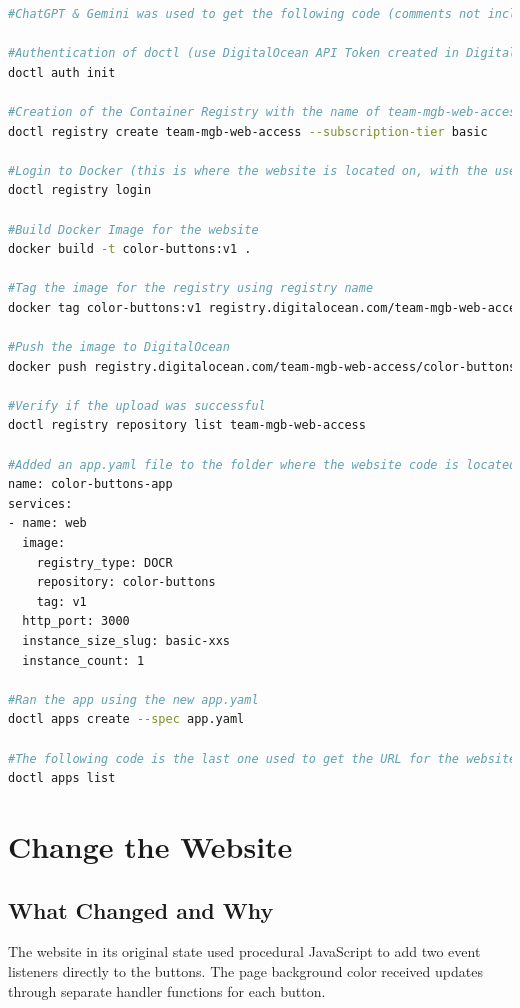 \begin{lstlisting}[style=linuxstyle, language=bash]
#ChatGPT & Gemini was used to get the following code (comments not included):

#Authentication of doctl (use DigitalOcean API Token created in DigitalOcean)
doctl auth init

#Creation of the Container Registry with the name of team-mgb-web-access and a basic tier subscription
doctl registry create team-mgb-web-access --subscription-tier basic

#Login to Docker (this is where the website is located on, with the use of DigitalOcean for cloud service)
doctl registry login

#Build Docker Image for the website
docker build -t color-buttons:v1 .

#Tag the image for the registry using registry name
docker tag color-buttons:v1 registry.digitalocean.com/team-mgb-web-access/color-buttons:v1

#Push the image to DigitalOcean
docker push registry.digitalocean.com/team-mgb-web-access/color-buttons:v1

#Verify if the upload was successful
doctl registry repository list team-mgb-web-access

#Added an app.yaml file to the folder where the website code is located, same place as the docker file, to tell DigitalOcean what to do with the Docker Image with the following code in it:
name: color-buttons-app
services:
- name: web
  image:
    registry_type: DOCR
    repository: color-buttons
    tag: v1
  http_port: 3000
  instance_size_slug: basic-xxs
  instance_count: 1

#Ran the app using the new app.yaml
doctl apps create --spec app.yaml

#The following code is the last one used to get the URL for the website
doctl apps list
\end{lstlisting}


\section{Change the Website}

\subsection{What Changed and Why}
The website in its original state used procedural JavaScript to add two event listeners directly to the buttons. The page background color received updates through separate handler functions for each button.

